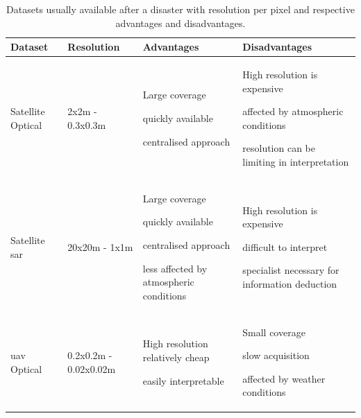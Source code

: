 \begin{table} [!h]
	\centering
	\captionsetup{justification=raggedright,singlelinecheck=false}
	\caption{\footnotesize{Datasets usually available after a disaster with resolution per pixel and respective advantages and disadvantages.}}
	\scriptsize{
		\begin{tabular}{p{2cm}p{2cm}p{3cm}p{3cm}}
			\toprule
			Dataset & Resolution & Advantages & Disadvantages \\
			\midrule
			Satellite Optical & 2x2m - 0.3x0.3m & \begin{itemize}[leftmargin=.1cm,noitemsep,topsep=0pt]{\item Large coverage \item quickly available \item centralised approach}\end{itemize} & \begin{itemize}[leftmargin=.1cm,noitemsep,topsep=0pt]{\item High resolution is expensive \item affected by atmospheric conditions \item resolution can be limiting in interpretation}\end{itemize}\\
			Satellite \ac{sar} & 20x20m - 1x1m & \begin{itemize}[leftmargin=.1cm,noitemsep,topsep=0pt]{\item Large coverage \item quickly available \item centralised approach \item less affected by atmospheric conditions}\end{itemize}& \begin{itemize}[leftmargin=.1cm,noitemsep,topsep=0pt]{\item High resolution is expensive \item difficult to interpret \item specialist necessary for information deduction}\end{itemize}\\
			\ac{uav} Optical & 0.2x0.2m - 0.02x0.02m& \begin{itemize}[leftmargin=.1cm,noitemsep,topsep=0pt]{\item High resolution relatively cheap \item easily interpretable}\end{itemize} & \begin{itemize}[leftmargin=.1cm,noitemsep,topsep=0pt]{\item Small coverage \item slow acquisition \item affected by weather conditions}\end{itemize}\\

\end{tabular}}
\end{table}
